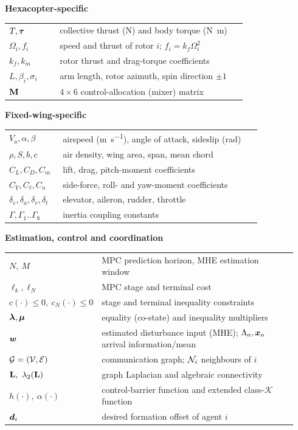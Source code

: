 \noindent\textbf{Hexacopter-specific}
{\small
\begin{longtable}{@{}p{0.20\linewidth}p{0.74\linewidth}@{}}
\toprule
$T,\bm{\tau}$ & collective thrust (\si{\newton}) and body torque (\si{\newton\meter}) \\
$\Omega_i,f_i$ & speed and thrust of rotor $i$; $f_i=k_f\Omega_i^2$ \\
$k_f,k_m$ & rotor thrust and drag-torque coefficients \\
$L,\beta_i,\sigma_i$ & arm length, rotor azimuth, spin direction $\pm1$ \\
$\mathbf{M}$ & $4\times6$ control-allocation (mixer) matrix \\
\bottomrule
\end{longtable}}

\noindent\textbf{Fixed-wing-specific}
{\small
\begin{longtable}{@{}p{0.20\linewidth}p{0.74\linewidth}@{}}
\toprule
$V_a,\alpha,\beta$ & airspeed (\si{\meter\per\second}), angle of attack, sideslip (\si{\radian}) \\
$\rho,S,b,c$ & air density, wing area, span, mean chord \\
$C_L,C_D,C_m$ & lift, drag, pitch-moment coefficients \\
$C_Y,C_\ell,C_n$ & side-force, roll- and yaw-moment coefficients \\
$\delta_e,\delta_a,\delta_r,\delta_t$ & elevator, aileron, rudder, throttle \\
$\Gamma,\Gamma_1..\Gamma_8$ & inertia coupling constants \\
\bottomrule
\end{longtable}}

\noindent\textbf{Estimation, control and coordination}
{\small
\begin{longtable}{@{}p{0.20\linewidth}p{0.74\linewidth}@{}}
\toprule
$N,\ M$ & MPC prediction horizon, MHE estimation window \\
$\ell_k,\ell_N$ & MPC stage and terminal cost \\
$c(\cdot)\le0,\ c_N(\cdot)\le0$ & stage and terminal inequality constraints \\
$\bm{\lambda},\bm{\mu}$ & equality (co-state) and inequality multipliers \\
$\bm{w}$ & estimated disturbance input (MHE); $\Lambda_a,\bm{x}_a$ arrival information/mean \\
$\mathcal{G}=(\mathcal V,\mathcal E)$ & communication graph; $\mathcal{N}_i$ neighbours of $i$ \\
$\Lap,\ \lambda_2(\Lap)$ & graph Laplacian and algebraic connectivity \\
$h(\cdot),\ \alpha(\cdot)$ & control-barrier function and extended class-$\mathcal K$ function \\
$\bm{d}_i$ & desired formation offset of agent $i$ \\
\bottomrule
\end{longtable}}
